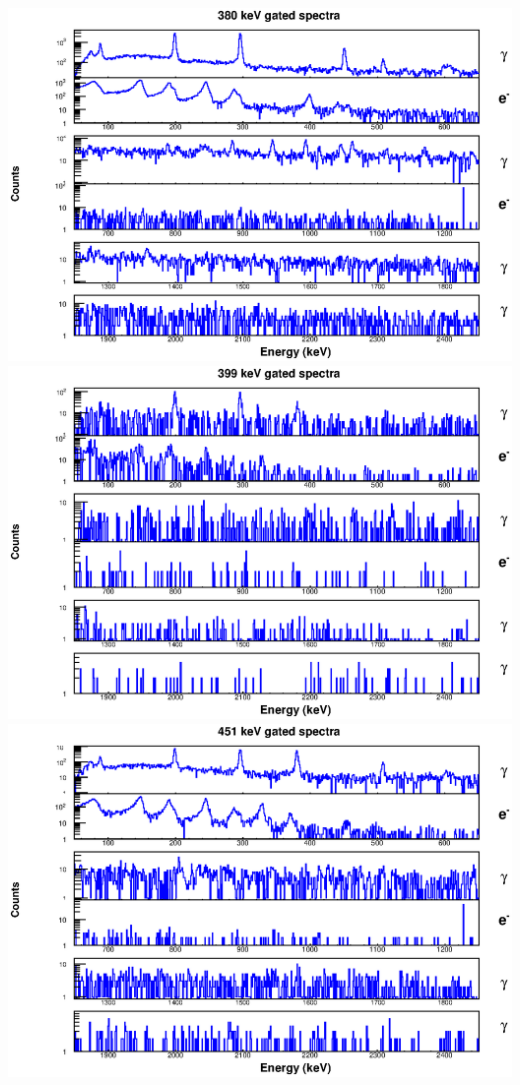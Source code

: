 \begin{landscape}
\includegraphics[scale=1.1]{156Gd_Appendix/380_combined.eps}
\includegraphics[scale=1.1]{156Gd_Appendix/399_combined.eps}
\includegraphics[scale=1.1]{156Gd_Appendix/451_combined.eps}

\end{landscape}
